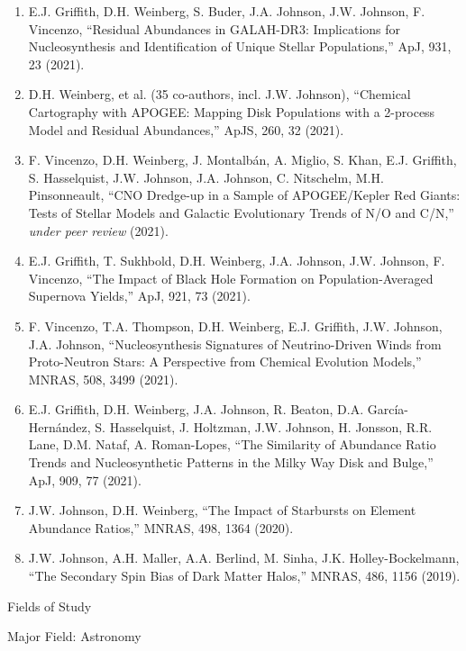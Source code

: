\documentclass[main.tex]{subfiles}
\begin{document}
\begin{singlespace}
\begin{enumerate}
	\item E.J. Griffith, D.H. Weinberg, S. Buder, J.A. Johnson, J.W. Johnson,
	F. Vincenzo, ``Residual Abundances in GALAH-DR3: Implications for
	Nucleosynthesis and Identification of Unique Stellar Populations,'' ApJ,
	931, 23 (2021).

	\item D.H. Weinberg, et al. (35 co-authors, incl. J.W. Johnson),
	``Chemical Cartography with APOGEE: Mapping Disk Populations with a
	2-process Model and Residual Abundances,'' ApJS, 260, 32 (2021).

	\item F. Vincenzo, D.H. Weinberg, J. Montalb\'an, A. Miglio, S. Khan,
	E.J. Griffith, S. Hasselquist, J.W. Johnson, J.A. Johnson, C. Nitschelm,
	M.H. Pinsonneault, ``CNO Dredge-up in a Sample of APOGEE/Kepler Red Giants:
	Tests of Stellar Models and Galactic Evolutionary Trends of N/O and C/N,''
	\textit{under peer review} (2021).

	\item E.J. Griffith, T. Sukhbold, D.H. Weinberg, J.A. Johnson, J.W. Johnson,
	F. Vincenzo, ``The Impact of Black Hole Formation on Population-Averaged
	Supernova Yields,'' ApJ, 921, 73 (2021).

	\item F. Vincenzo, T.A. Thompson, D.H. Weinberg, E.J. Griffith,
	J.W. Johnson, J.A. Johnson, ``Nucleosynthesis Signatures of Neutrino-Driven
	Winds from Proto-Neutron Stars: A Perspective from Chemical Evolution
	Models,'' MNRAS, 508, 3499 (2021).

	\item E.J. Griffith, D.H. Weinberg, J.A. Johnson, R. Beaton, D.A.
	Garc\'ia-Hern\'andez, S. Hasselquist, J. Holtzman, J.W. Johnson,
	H. J\:onsson, R.R. Lane, D.M. Nataf, A. Roman-Lopes, ``The Similarity of
	Abundance Ratio Trends and Nucleosynthetic Patterns in the Milky Way Disk
	and Bulge,'' ApJ, 909, 77 (2021).

	\item J.W. Johnson, D.H. Weinberg, ``The Impact of Starbursts on Element
	Abundance Ratios,'' MNRAS, 498, 1364 (2020).

	\item J.W. Johnson, A.H. Maller, A.A. Berlind, M. Sinha,
	J.K. Holley-Bockelmann, ``The Secondary Spin Bias of Dark Matter Halos,''
	MNRAS, 486, 1156 (2019).

\end{enumerate}


\begin{center}
{\large Fields of Study}
\end{center}
Major Field: Astronomy
\end{singlespace}

\end{document}
